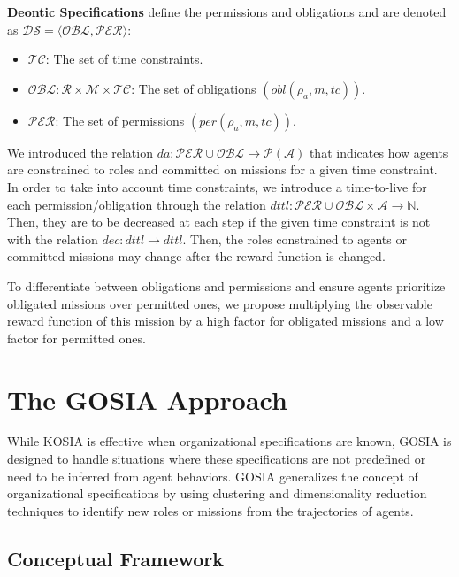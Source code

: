 \documentclass[sn-mathphys-num]{sn-jnl}%
\theoremstyle{thmstyleone}%
\theoremstyle{thmstyletwo}%
\theoremstyle{thmstylethree}%
\begin{document}
\textbf{Deontic Specifications} define the permissions and obligations and are denoted as $\mathcal{DS} = \langle \mathcal{OBL}, \mathcal{PER} \rangle$:

\begin{itemize}
    \item $\mathcal{TC}$: The set of time constraints.
    \item $\mathcal{OBL}: \mathcal{R} \times \mathcal{M} \times \mathcal{TC}$: The set of obligations $(obl(\rho_a, m, tc))$.
    \item $\mathcal{PER}$: The set of permissions $(per(\rho_a, m, tc))$.
\end{itemize}

We introduced the relation $da: \mathcal{PER} \cup \mathcal{OBL} \rightarrow \mathcal{P}(\mathcal{A})$ that indicates how agents are constrained to roles and committed on missions for a given time constraint. In order to take into account time constraints, we introduce a time-to-live for each permission/obligation through the relation $dttl: \mathcal{PER} \cup \mathcal{OBL} \times \mathcal{A} \rightarrow \mathbb{N}$. Then, they are to be decreased at each step if the given time constraint is not  with the relation $dec: dttl \rightarrow dttl$. Then, the roles constrained to agents or committed missions may change after the reward function is changed.

To differentiate between obligations and permissions and ensure agents prioritize obligated missions over permitted ones, we propose multiplying the observable reward function of this mission by a high factor for obligated missions and a low factor for permitted ones.



\section{The GOSIA Approach}
\label{sec:gosia}

While KOSIA is effective when organizational specifications are known, GOSIA is designed to handle situations where these specifications are not predefined or need to be inferred from agent behaviors. GOSIA generalizes the concept of organizational specifications by using clustering and dimensionality reduction techniques to identify new roles or missions from the trajectories of agents.

\subsection{Conceptual Framework}
\end{document}
